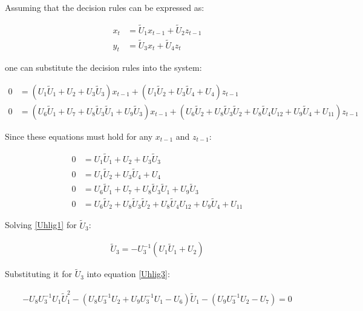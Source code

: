 \documentclass{pracamgr}
\numberwithin{equation}{section}
\begin{document}
Assuming that the decision rules can be expressed as:

\begin{align}
x_{t} &= \tilde{U}_{1}x_{t-1} + \tilde{U}_{2}z_{t-1} \nonumber \\
y_{t} &= \tilde{U}_{3}x_{t} + \tilde{U}_{4}z_{t}
\end{align}

%

one can substitute the decision rules into the system:

\begin{align}
0 &= (U_{1}\tilde{U}_{1}+U_{2}+U_{3}\tilde{U}_{3})x_{t-1}+(U_{1}\tilde{U}_{2}+U_{3}\tilde{U}_{4}+U_{4})z_{t-1} \nonumber \\
0 &= (U_{6}\tilde{U}_{1}+U_{7}+U_{8}\tilde{U}_{3}\tilde{U}_{1}+U_{9}\tilde{U}_{3})x_{t-1}+(U_{6}\tilde{U}_{2}+U_{8}\tilde{U}_{3}\tilde{U}_{2}+U_{8}\tilde{U}_{4}U_{12}+U_{9}\tilde{U}_{4}+U_{11})z_{t-1}
\end{align}

Since these equations must hold for any $x_{t-1}$ and $z_{t-1}$:

\begin{align}
0 &= U_{1}\tilde{U}_{1}+U_{2}+U_{3}\tilde{U}_{3}  \label{Uhlig1} \\
0 &= U_{1}\tilde{U}_{2}+U_{3}\tilde{U}_{4}+U_{4}  \label{Uhlig2} \\
0 &= U_{6}\tilde{U}_{1}+U_{7}+U_{8}\tilde{U}_{3}\tilde{U}_{1}+U_{9}\tilde{U}_{3}  \label{Uhlig3} \\
0 &= U_{6}\tilde{U}_{2}+U_{8}\tilde{U}_{3}\tilde{U}_{2}+U_{8}\tilde{U}_{4}U_{12}+U_{9}\tilde{U}_{4}+U_{11} \label{Uhlig4}
\end{align}

Solving \ref{Uhlig1} for $\tilde{U}_{3}$:

\begin{align}
\tilde{U}_{3} = -U_{3}^{-1} \left(U_{1}\tilde{U}_{1} + U_{2} \right)
\end{align}

Substituting it for $\tilde{U}_{3}$ into equation \ref{Uhlig3}:

\begin{align}
-U_{8}U_{3}^{-1}U_{1}\tilde{U}_{1}^{2} - \left(U_{8}U_{3}^{-1}U_{2} + U_{9}U_{3}^{-1}U_{1} - U_{6} \right)\tilde{U}_{1} - \left(U_{9}U_{3}^{-1}U_{2} - U_{7} \right) = 0
\end{align} 
\end{document}
